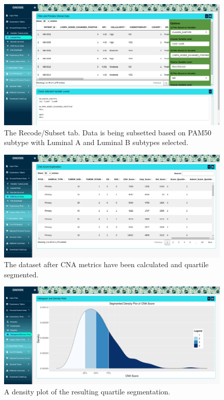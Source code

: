 \vfill 
\begin{figure}[H]
\center
\includegraphics[width=1\textwidth]{../figures/Chapter_3/GNOSIS_Fig2.png}
\caption[The Recode/Subset tab.]{The Recode/Subset tab. Data is being subsetted based on PAM50 subtype with Luminal A and Luminal B subtypes selected.}
\label{GNOSIS_Fig2}
\end{figure}
\vspace{1.2cm}
\begin{figure}[!h]
\center
\includegraphics[width=1\textwidth]{../figures/Chapter_3/GNOSIS_Fig3.png}
\caption[The dataset after CNA metrics have been calculated and quartile segmented.]{The dataset after CNA metrics have been calculated and quartile segmented.}
\label{GNOSIS_Fig3}
\end{figure}
\vfill 
\clearpage
\begin{figure}[H]
\center
\includegraphics[width=1\textwidth]{../figures/Chapter_3/GNOSIS_Fig4.png}
\caption[A density plot of the resulting quartile segmentation.]{A density plot of the resulting quartile segmentation.}
\label{GNOSIS_Tab4}
\end{figure}


